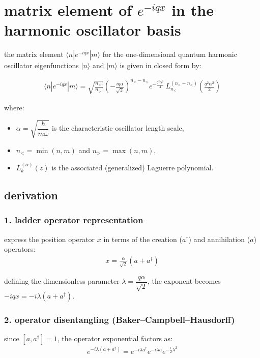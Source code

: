 

\section{matrix element of \texorpdfstring{$e^{-iqx}$}{e\textsuperscript{-iqx}} in the harmonic oscillator basis}

the matrix element $\langle n | e^{-iqx} | m \rangle$ for the one-dimensional quantum harmonic oscillator eigenfunctions $|n\rangle$ and $|m\rangle$ is given in closed form by:

\begin{align}
  \langle n | e^{-iqx} | m \rangle = \sqrt{\frac{n_<!}{n_>!}} \left(-\frac{i q \alpha }{\sqrt{2}}\right)^{n_> - n_<} e^{-\frac{q^2 \alpha ^2}{4}} \, L_{n_<}^{(n_> - n_<)}\!\left(\frac{q^2 \alpha ^2}{2}\right)\label{me-ho}
\end{align}

\noindent where:
\begin{itemize}
  \item $\alpha  = \sqrt{\dfrac{\hbar}{m\omega}}$ is the characteristic oscillator length scale,
  \item $n_< = \min(n, m)$ and $n_> = \max(n, m)$,
  \item $L_k^{(\alpha)}(z)$ is the associated (generalized) Laguerre polynomial.
\end{itemize}

\subsection{derivation}

\subsubsection{1. ladder operator representation}
express the position operator $x$ in terms of the creation ($a^\dagger$) and annihilation ($a$) operators:
\begin{align}
  x = \frac{\alpha }{\sqrt{2}} (a + a^\dagger)
\end{align}

defining the dimensionless parameter $\lambda = \dfrac{q \alpha }{\sqrt{2}}$, the exponent becomes $-i q x = -i \lambda (a + a^\dagger)$.

\subsubsection{2. operator disentangling (Baker--Campbell--Hausdorff)}
since $[a, a^\dagger] = 1$, the operator exponential factors as:
\begin{align}
  e^{-i \lambda (a + a^\dagger)} = e^{-i \lambda a^\dagger} e^{-i \lambda a} e^{-\frac{1}{2} \lambda^2}
\end{align}

